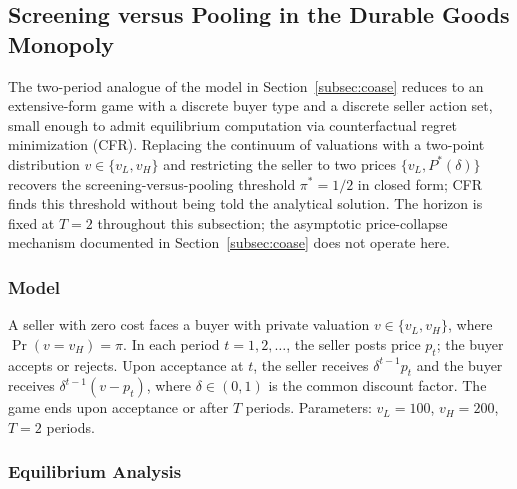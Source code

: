 \subsection{Screening versus Pooling in the Durable Goods Monopoly}
\label{subsec:durable_goods_screening}

The two-period analogue of the model in Section~\ref{subsec:coase} reduces to an extensive-form game with a discrete buyer type and a discrete seller action set, small enough to admit equilibrium computation via counterfactual regret minimization (CFR). Replacing the continuum of valuations with a two-point distribution $v \in \{v_L, v_H\}$ and restricting the seller to two prices $\{v_L, P^*(\delta)\}$ recovers the screening-versus-pooling threshold $\pi^* = 1/2$ in closed form; CFR finds this threshold without being told the analytical solution. The horizon is fixed at $T = 2$ throughout this subsection; the asymptotic price-collapse mechanism documented in Section~\ref{subsec:coase} does not operate here.

\subsubsection{Model}

A seller with zero cost faces a buyer with private valuation $v \in \{v_L, v_H\}$, where $\Pr(v = v_H) = \pi$. In each period $t = 1, 2, \ldots$, the seller posts price $p_t$; the buyer accepts or rejects. Upon acceptance at $t$, the seller receives $\delta^{t-1} p_t$ and the buyer receives $\delta^{t-1}(v - p_t)$, where $\delta \in (0,1)$ is the common discount factor. The game ends upon acceptance or after $T$ periods. Parameters: $v_L = 100$, $v_H = 200$, $T = 2$ periods.

\subsubsection{Equilibrium Analysis}

